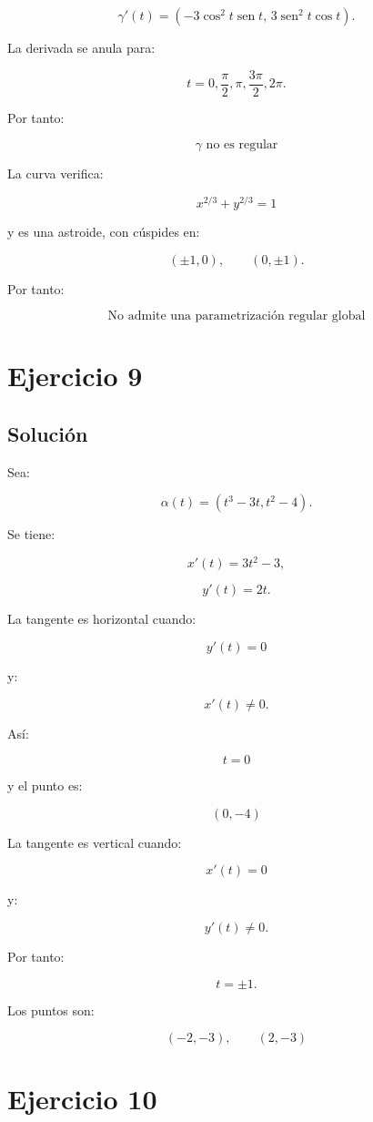 \documentclass[11pt,a4paper]{article}
\newcommand{\sen}{\operatorname{sen}}
\begin{document}
\[
\gamma'(t)
=
(-3\cos^2t\sen t,\,
3\sen^2t\cos t).
\]

La derivada se anula para:

\[
t=0,\frac{\pi}{2},\pi,\frac{3\pi}{2},2\pi.
\]

Por tanto:

\[
\boxed{
\gamma\text{ no es regular}
}
\]

La curva verifica:

\[
\boxed{
x^{2/3}+y^{2/3}=1
}
\]

y es una astroide, con cúspides en:

\[
(\pm1,0),
\qquad
(0,\pm1).
\]

Por tanto:

\[
\boxed{
\text{No admite una parametrización regular global}
}
\]

\section{Ejercicio 9}
\subsection{Solución}

Sea:

\[
\alpha(t)
=
(t^3-3t,t^2-4).
\]

Se tiene:

\[
x'(t)=3t^2-3,
\]

\[
y'(t)=2t.
\]

La tangente es horizontal cuando:

\[
y'(t)=0
\]

y:

\[
x'(t)\neq0.
\]

Así:

\[
t=0
\]

y el punto es:

\[
\boxed{
(0,-4)
}
\]

La tangente es vertical cuando:

\[
x'(t)=0
\]

y:

\[
y'(t)\neq0.
\]

Por tanto:

\[
t=\pm1.
\]

Los puntos son:

\[
\boxed{
(-2,-3),
\qquad
(2,-3)
}
\]

\section{Ejercicio 10}
\end{document}
